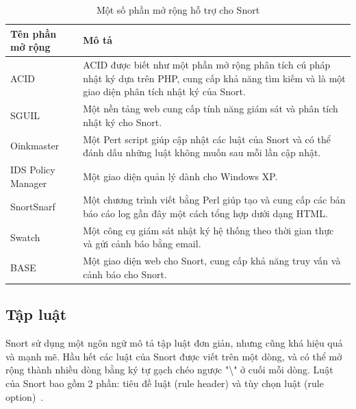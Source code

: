 \begin{table}[!htbp]
\centering
\small
\setlength{\extrarowheight}{0.2pt}
\caption{\label{tab:snort-addons}Một số phần mở rộng hỗ trợ cho Snort}
\begin{tabular}{|p{4cm}|p{10.5cm}|}
\hline
\textbf{Tên phần mở rộng}                 & \textbf{Mô tả}                                                                                                                                          \\ \hline
ACID                                      & ACID được biết như một phần mở rộng phân tích cú pháp nhật ký dựa trên PHP, cung cấp khả năng tìm kiếm và là một giao diện phân tích nhật ký của Snort. \\ \hline
SGUIL                                    & Một nền tảng web cung cấp tính năng giám sát và phân tích nhật ký cho Snort.                                                                            \\ \hline
Oinkmaster                             & Một Pert script giúp cập nhật các luật của Snort và có thể đánh dấu những luật không muốn sau mỗi lần cập nhật.                                         \\ \hline
IDS Policy Manager               & Một giao diện quản lý dành cho Windows XP.                                                                                                              \\ \hline
SnortSnarf                               & Một chương trình viết bằng Perl giúp tạo và cung cấp các bản báo cáo log gần đây một cách tổng hợp dưới dạng HTML.                                      \\ \hline
Swatch                                     & Một công cụ giám sát nhật ký hệ thống theo thời gian thực và gửi cảnh báo bằng email.                                                                   \\ \hline
BASE                                      & Một giao diện web cho Snort, cung cấp khả năng truy vấn và cảnh báo cho Snort.                                                                          \\ \hline
\end{tabular}
\end{table}

\subsection{Tập luật}
Snort sử dụng một ngôn ngữ mô tả tập luật đơn giản, nhưng cũng khá hiệu quả và mạnh mẽ. Hầu hết các luật của Snort được viết trên một dòng, và có thể mở rộng thành nhiều dòng bằng ký tự gạch chéo ngược "\textbackslash " ở cuối mỗi dòng. Luật của Snort bao gồm 2 phần: tiêu đề luật (rule header) và tùy chọn luật (rule option)~\cite{snort2017documents}.

